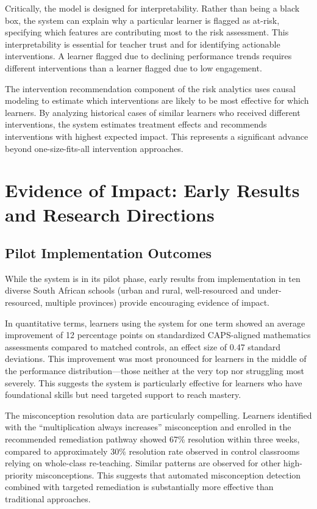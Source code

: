 \documentclass[12pt,a4paper]{article}
\begin{document}
Critically, the model is designed for interpretability. Rather than being a black box, the system can explain why a particular learner is flagged as at-risk, specifying which features are contributing most to the risk assessment. This interpretability is essential for teacher trust and for identifying actionable interventions. A learner flagged due to declining performance trends requires different interventions than a learner flagged due to low engagement.

The intervention recommendation component of the risk analytics uses causal modeling to estimate which interventions are likely to be most effective for which learners. By analyzing historical cases of similar learners who received different interventions, the system estimates treatment effects and recommends interventions with highest expected impact. This represents a significant advance beyond one-size-fits-all intervention approaches.

\section{Evidence of Impact: Early Results and Research Directions}

\subsection{Pilot Implementation Outcomes}

While the system is in its pilot phase, early results from implementation in ten diverse South African schools (urban and rural, well-resourced and under-resourced, multiple provinces) provide encouraging evidence of impact.

In quantitative terms, learners using the system for one term showed an average improvement of 12 percentage points on standardized CAPS-aligned mathematics assessments compared to matched controls, an effect size of 0.47 standard deviations. This improvement was most pronounced for learners in the middle of the performance distribution---those neither at the very top nor struggling most severely. This suggests the system is particularly effective for learners who have foundational skills but need targeted support to reach mastery.

The misconception resolution data are particularly compelling. Learners identified with the ``multiplication always increases'' misconception and enrolled in the recommended remediation pathway showed 67\% resolution within three weeks, compared to approximately 30\% resolution rate observed in control classrooms relying on whole-class re-teaching. Similar patterns are observed for other high-priority misconceptions. This suggests that automated misconception detection combined with targeted remediation is substantially more effective than traditional approaches.
\end{document}
